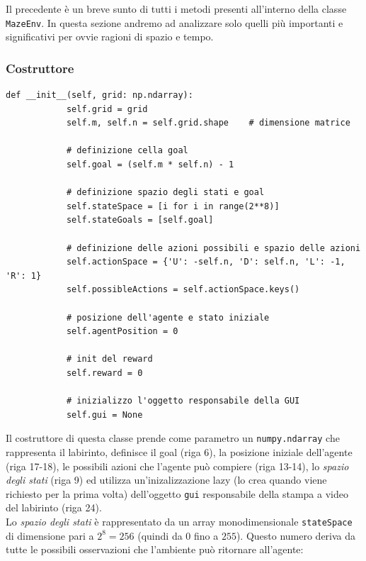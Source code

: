Il precedente \`{e} un breve sunto di tutti i metodi presenti all'interno della classe \lstinline[style=cmd]|MazeEnv|. In questa sezione andremo ad analizzare solo quelli pi\`{u} importanti e significativi per ovvie ragioni di spazio e tempo.

\subsubsection{Costruttore}

\begin{lstlisting}[style=python, caption={Costruttore di MazeEnv.py}]
    def __init__(self, grid: np.ndarray):
			self.grid = grid
			self.m, self.n = self.grid.shape    # dimensione matrice
			
			# definizione cella goal
			self.goal = (self.m * self.n) - 1
			
			# definizione spazio degli stati e goal
			self.stateSpace = [i for i in range(2**8)]
			self.stateGoals = [self.goal]
			
			# definizione delle azioni possibili e spazio delle azioni
			self.actionSpace = {'U': -self.n, 'D': self.n, 'L': -1, 'R': 1}
			self.possibleActions = self.actionSpace.keys()
			
			# posizione dell'agente e stato iniziale
			self.agentPosition = 0
			
			# init del reward
			self.reward = 0
			
			# inizializzo l'oggetto responsabile della GUI
			self.gui = None
\end{lstlisting}

Il costruttore di questa classe prende come parametro un \lstinline[style=cmd]|numpy.ndarray| che rappresenta il labirinto, definisce il goal (riga 6), la posizione iniziale dell'agente (riga 17-18), le possibili azioni che l'agente pu\`{o} compiere (riga 13-14), lo \textit{spazio degli stati} (riga 9) ed utilizza un'inizalizzazione lazy (lo crea quando viene richiesto per la prima volta) dell'oggetto \lstinline[style=cmd]|gui| responsabile della stampa a video del labirinto (riga 24). \\

Lo \textit{spazio degli stati} \`{e} rappresentato da un array monodimensionale \lstinline[style=cmd]|stateSpace| di dimensione pari a $2^8 = 256$ (quindi da $0$ fino a $255$). Questo numero deriva da tutte le possibili osservazioni che l'ambiente pu\`{o} ritornare all'agente:

